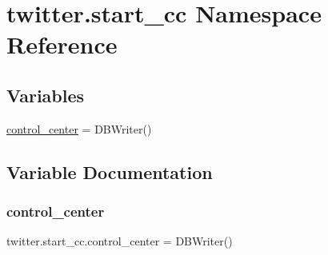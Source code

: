 \hypertarget{namespacetwitter_1_1start__cc}{}\section{twitter.\+start\+\_\+cc Namespace Reference}
\label{namespacetwitter_1_1start__cc}
\subsection*{Variables}
\begin{DoxyCompactItemize}
\item 
\hyperlink{namespacetwitter_1_1start__cc_accf26b78f86dc60aebde5b4c72af5efd}{control\+\_\+center} = D\+B\+Writer()
\end{DoxyCompactItemize}


\subsection{Variable Documentation}
\mbox{\label{namespacetwitter_1_1start__cc_accf26b78f86dc60aebde5b4c72af5efd}} 
\subsubsection{\texorpdfstring{control\+\_\+center}{control\_center}}
{\footnotesize\ttfamily twitter.\+start\+\_\+cc.\+control\+\_\+center = D\+B\+Writer()}

